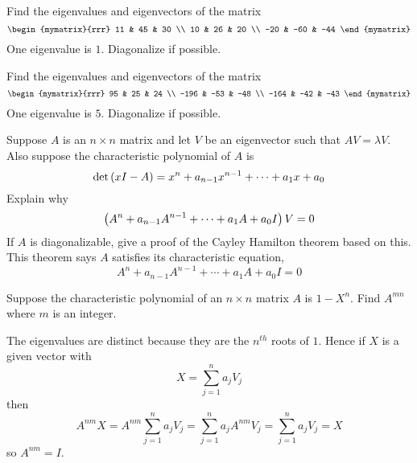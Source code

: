 \begin{enumialphparenastyle}
\begin{ex} Find the eigenvalues and eigenvectors of the matrix 
\begin{equation*}
\begin{mymatrix}{rrr}
11 & 45 & 30 \\
10 & 26 & 20 \\
-20 & -60 & -44
\end{mymatrix}
\end{equation*}
One eigenvalue is $1.$ Diagonalize if possible.
\end{ex}

\begin{ex} Find the eigenvalues and eigenvectors of the matrix  
\begin{equation*}
\begin{mymatrix}{rrr}
95 & 25 & 24 \\
-196 & -53 & -48 \\
-164 & -42 & -43
\end{mymatrix}
\end{equation*}
One eigenvalue is $5.$ Diagonalize if possible.
\end{ex}

\begin{ex} Suppose $A$ is an $n\times n$ matrix and let $V$ be an
eigenvector such that $AV=\lambda V$. Also suppose the
characteristic polynomial of $A$ is
\begin{equation*}
\det \left(x I-A\right) =x ^{n}+a_{n-1} x ^{n-1}+\cdots
+a_{1}x +a_{0}
\end{equation*}
Explain why
\begin{equation*}
\left(A^{n}+a_{n-1}A^{n-1}+\cdots +a_{1}A+a_{0}I\right) V=0
\end{equation*}
If $A$ is diagonalizable, give a proof of the Cayley Hamilton
theorem based on this. This theorem says $A$ satisfies its
characteristic equation,
\begin{equation*}
A^{n}+a_{n-1}A^{n-1}+\cdots +a_{1}A+a_{0}I=0
\end{equation*} 
\end{ex}

\begin{ex} Suppose the characteristic polynomial of an $n\times n$ matrix $A$ is 
$1-X ^{n}$. Find $A^{mn}$ where $m$ is an integer. 
\begin{sol}
The eigenvalues are distinct because
they are the $n^{th}$ roots of $1$. Hence if $X$ is a given vector with
\[
X=\sum_{j=1}^{n}a_{j}V_{j}
\]
then
\[
A^{nm}X=A^{nm}\sum_{j=1}^{n}a_{j}V_{j}=
\sum_{j=1}^{n}a_{j}A^{nm}V_{j}=\sum_{j=1}^{n}a_{j}V_{j}=X
\]
so $A^{nm}=I$.
\end{sol}
\end{ex}

\end{enumialphparenastyle}